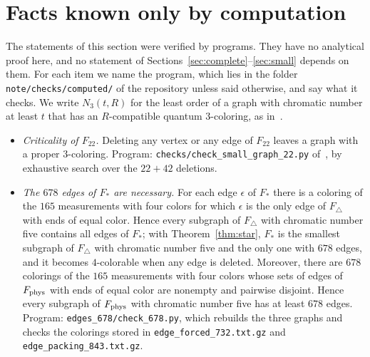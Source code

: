 \section{Facts known only by computation}\label{sec:computed}

The statements of this section were verified by programs. They have no analytical proof here, and no statement of Sections~\ref{sec:complete}--\ref{sec:small} depends on them. For each item we name the program, which lies in the folder \texttt{note/checks/computed/} of the repository unless said otherwise, and say what it checks. We write $N_3(t,R)$ for the least order of a graph with chromatic number at least $t$ that has an $R$-compatible quantum $3$-coloring, as in~\cite{Z}.

\begin{itemize}
\item[(C1)] \emph{Criticality of $F_{22}$.} Deleting any vertex or any edge of $F_{22}$ leaves a graph with a proper $3$-coloring. Program: \texttt{checks/check\_small\_graph\_22.py} of~\cite{Z}, by exhaustive search over the $22+42$ deletions.

\item[(C2)] \emph{The $678$ edges of $F_*$ are necessary.} For each edge $\epsilon$ of $F_*$ there is a coloring of the $165$ measurements with four colors for which $\epsilon$ is the only edge of $F_\triangle$ with ends of equal color. Hence every subgraph of $F_\triangle$ with chromatic number five contains all edges of $F_*$; with Theorem~\ref{thm:star}, $F_*$ is the smallest subgraph of $F_\triangle$ with chromatic number five and the only one with $678$ edges, and it becomes $4$-colorable when any edge is deleted. Moreover, there are $678$ colorings of the $165$ measurements with four colors whose sets of edges of $F_{\rm phys}$ with ends of equal color are nonempty and pairwise disjoint. Hence every subgraph of $F_{\rm phys}$ with chromatic number five has at least $678$ edges. Program: \texttt{edges\_678/check\_678.py}, which rebuilds the three graphs and checks the colorings stored in \texttt{edge\_forced\_732.txt.gz} and \texttt{edge\_packing\_843.txt.gz}.


\end{itemize}
